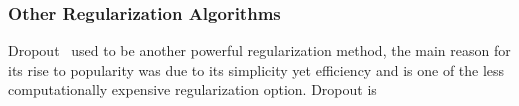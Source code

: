 \subsubsection{Other Regularization Algorithms}

Dropout~\cite{JMLR:v15:srivastava14a} used to be another powerful regularization method, the main reason for its rise to popularity was due to its simplicity yet efficiency and is one of the less computationally expensive regularization option. Dropout is 